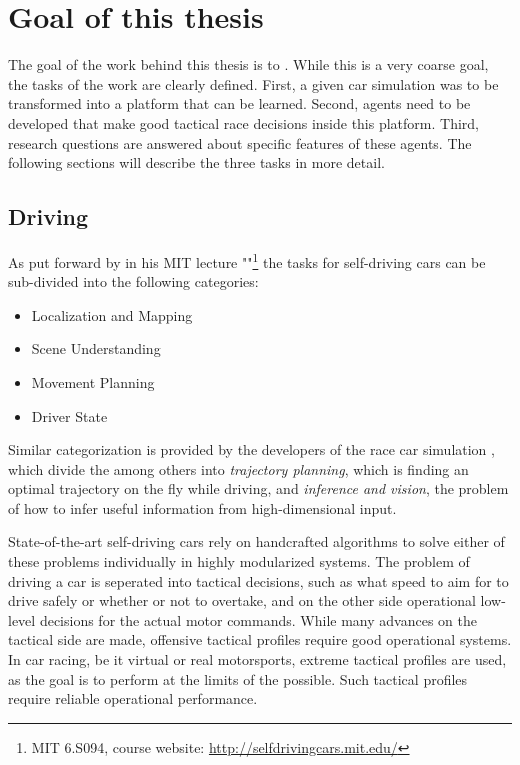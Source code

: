 \section{Goal of this thesis}

The goal of the work behind this thesis is to . While this is a very coarse goal, the tasks of the work are clearly defined. First, a given car simulation was to be transformed into a platform that can be learned. Second, agents need to be developed that make good tactical race decisions inside this platform. Third, research questions are answered about specific features of these agents. The following sections will describe the three tasks in more detail.

\subsection{Driving}

As put forward by  in his MIT lecture ""\footnote{MIT 6.S094, course website: \url{http://selfdrivingcars.mit.edu/}} the tasks for self-driving cars can be sub-divided into the following categories: 
\begin{itemize}[noitemsep]
	\item Localization and Mapping
	\item Scene Understanding
	\item Movement Planning
	\item Driver State
\end{itemize}

Similar categorization is provided by the developers of the race car simulation \cite{wymann_torcs_2015}, which divide the  among others into \textit{trajectory planning}, which is finding an optimal trajectory on the fly while driving, and \textit{inference and vision}, the problem of how to infer useful information from high-dimensional input.

State-of-the-art self-driving cars rely on handcrafted algorithms to solve either of these problems individually in highly modularized systems. The problem of driving a car is seperated into tactical decisions, such as what speed to aim for to drive safely or whether or not to overtake, and on the other side operational low-level decisions for the actual motor commands. While many advances on the tactical side are made, offensive tactical profiles require good operational systems. In car racing, be it virtual or real motorsports, extreme tactical profiles are used, as the goal is to perform at the limits of the possible. Such tactical profiles require reliable operational performance.

